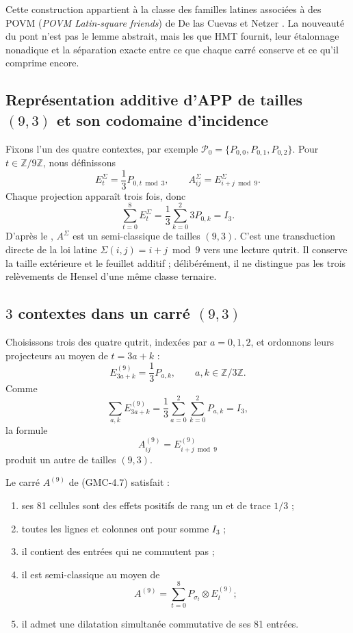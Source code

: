 Cette construction appartient à la classe des familles latines associées à des POVM
(\emph{POVM Latin-square friends})
de De las Cuevas et Netzer \citep{delascuevas2023latin}. La nouveauté du pont n'est pas le lemme
abstrait, mais les \POVM que HMT fournit, leur étalonnage nonadique et la
séparation exacte entre ce que chaque carré conserve et ce qu'il
comprime encore.

\subsection{Représentation additive d'APP de tailles \((9,3)\) et son codomaine d'incidence}

Fixons l'un des quatre contextes, par exemple
$\mathcal P_0=\{P_{0,0},P_{0,1},P_{0,2}\}$. Pour $t\in\mathbb Z/9\mathbb Z$,
nous définissons
\[
 E_t^{\Sigma}=\frac13P_{0,t\bmod3},
 \qquad
 A_{ij}^{\Sigma}=E_{i+j\bmod9}^{\Sigma}.
 \tag{GMC-4.5}
\]
Chaque projection apparaît trois fois, donc
\[
 \sum_{t=0}^{8}E_t^{\Sigma}
 =\frac13\sum_{k=0}^2 3P_{0,k}=I_3.
\]
D'après le , $A^\Sigma$ est un \QMS semi-classique de tailles
$(9,3)$. C'est une transduction directe de la loi latine
$\Sigma(i,j)=i+j\bmod9$ vers une lecture qutrit. Il conserve la taille extérieure et
le feuillet additif ; délibérément, il ne distingue pas les trois relèvements de Hensel d'une
même classe ternaire.

\subsection{\(3\) contextes dans un carré $(9,3)$}

Choisissons trois des quatre \PVM qutrit, indexées par $a=0,1,2$, et ordonnons
leurs projecteurs au moyen de $t=3a+k$ :
\[
 E_{3a+k}^{(9)}=\frac13P_{a,k},
 \qquad a,k\in\mathbb Z/3\mathbb Z.
 \tag{GMC-4.6}
\]
Comme
\[
 \sum_{a,k}E_{3a+k}^{(9)}
 =\frac13\sum_{a=0}^2\sum_{k=0}^2P_{a,k}=I_3,
\]
la formule
\[
 A_{ij}^{(9)}=E_{i+j\bmod9}^{(9)}
 \tag{GMC-4.7}
\]
produit un autre \QMS de tailles $(9,3)$.

\begin{theorem}
\label{p12-83-c22-s3:gmc:thm:qms-9-3}
Le carré $A^{(9)}$ de \textup{(GMC-4.7)} satisfait :

\begin{enumerate}
 \item ses 81 cellules sont des effets positifs de rang un et de trace $1/3$ ;
 \item toutes les lignes et colonnes ont pour somme $I_3$ ;
 \item il contient des entrées qui ne commutent pas ;
 \item il est semi-classique au moyen de
 \[
 A^{(9)}=\sum_{t=0}^{8}P_{\sigma_t}\otimes E_t^{(9)};
 \tag{GMC-4.8}
 \]
 \item il admet une dilatation simultanée commutative de ses 81
 entrées.
\end{enumerate}
\end{theorem}

